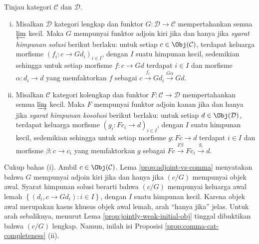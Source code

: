 \begin{teorema}\label{prop:GAFT}
	Tinjau kategori $\mathcal{C}$ dan $\mathcal{D}$.
	\begin{enumerate}[(i)]
		\item Misalkan $\mathcal{D}$ kategori lengkap dan funktor
		$G:\mathcal{D}\to\mathcal{C}$ mempertahankan semua $\varprojlim$
		kecil. Maka $G$ mempunyai funktor adjoin kiri jika dan hanya jika
		\emph{syarat himpunan solusi} berikut berlaku: untuk setiap
		$c\in\Obj(\mathcal{C})$, terdapat keluarga morfisme
		$\left(f_i:c\to Gd_i\right)_{i\in I}$, dengan $I$ suatu himpunan
		kecil, sedemikian sehingga untuk setiap morfisme $f:c\to Gd$ terdapat
		$i\in I$ dan morfisme $\alpha:d_i\to d$ yang memfaktorkan $f$ sebagai
		$c\xrightarrow{f_i}Gd_i\xrightarrow{G\alpha}Gd$.
		\item Misalkan $\mathcal{C}$ kategori kolengkap dan funktor
		$F:\mathcal{C}\to\mathcal{D}$ mempertahankan semua $\varinjlim$
		kecil. Maka $F$ mempunyai funktor adjoin kanan jika dan hanya jika
		\emph{syarat himpunan kosolusi} berikut berlaku: untuk setiap
		$d\in\Obj(\mathcal{D})$, terdapat keluarga morfisme
		$\left(g_i:Fc_i\to d\right)_{i\in I}$, dengan $I$ suatu himpunan
		kecil, sedemikian sehingga untuk setiap morfisme $g:Fc\to d$ terdapat
		$i\in I$ dan morfisme $\beta:c\to c_i$ yang memfaktorkan $g$ sebagai
		$Fc\xrightarrow{F\beta}Fc_i\xrightarrow{g_i}d$.
	\end{enumerate}
\end{teorema}
\begin{bukti}
	Cukup bahas (i). Ambil $c\in\Obj(\mathcal{C})$. Lema
	\ref{prop:adjoint-vs-comma} menyatakan bahwa $G$ mempunyai adjoin kiri
	jika dan hanya jika $(c/G)$ mempunyai objek awal. Syarat himpunan solusi
	berarti bahwa $(c/G)$ mempunyai keluarga awal lemah
	$\left\{(d_i,c\to Gd_i):i\in I\right\}$, dengan $I$ suatu himpunan
	kecil. Karena objek awal merupakan kasus khusus objek awal lemah, arah
	``hanya jika'' jelas. Untuk arah sebaliknya, menurut Lema
	\ref{prop:jointly-weak-initial-obj} tinggal dibuktikan bahwa $(c/G)$
	lengkap. Namun, inilah isi Proposisi
	\ref{prop:comma-cat-completeness} (ii).
\end{bukti}

